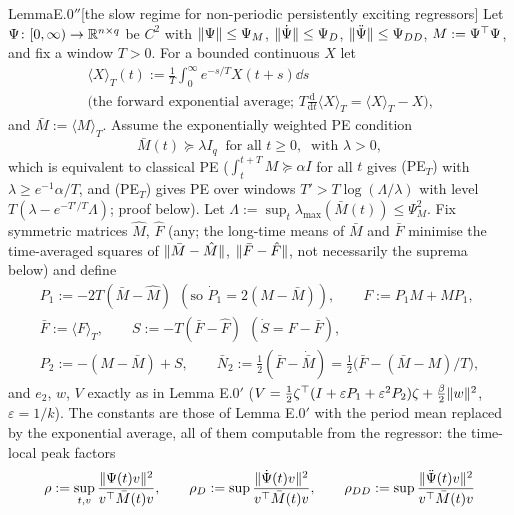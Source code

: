 \begin{thm}{Lemma}{E.0$''$}[the slow regime for non-periodic persistently exciting regressors]
Let $\Psi\colon[0,\infty)\to\mathbb{R}^{n\times q}$ be $C^2$ with $\lVert \Psi\rVert\le\Psi_M$, $\lVert \dot\Psi\rVert\le\Psi_D$,
$\lVert \ddot\Psi\rVert\le\Psi_{DD}$, $M:=\Psi^\top\Psi$, and fix a window $T>0$. For a bounded continuous $X$ let
\begin{gather*}
  \langle X\rangle_T(t):=\frac1T\int_0^\infty e^{-s/T}X(t+s)\dd s\\
  \text{(the forward exponential average; $T\tfrac{\mathrm{d}}{\mathrm{d}t}\langle X\rangle_T=\langle X\rangle_T-X$),}
\end{gather*}
and $\bar M:=\langle M\rangle_T$. Assume the exponentially weighted PE condition
\begin{equation}
  \bar M(t)\succeq\lambda I_q\ \text{ for all }t\ge0,\ \text{ with }\lambda>0,
  \tag{PE$_T$}
\end{equation}
which is equivalent to classical PE ($\int_t^{t+T}M\succeq\alpha I$ for all $t$ gives \textup{(PE$_T$)} with
$\lambda\ge e^{-1}\alpha/T$, and \textup{(PE$_T$)} gives PE over windows $T'>T\log(\Lambda/\lambda)$ with level
$T(\lambda-e^{-T'/T}\Lambda)$; proof below). Let $\Lambda:=\sup_t\lambda_{\max}(\bar M(t))\le\Psi_M^2$. Fix symmetric
matrices $\hat M$, $\hat F$ (any; the long-time means of $\bar M$ and $\bar F$ minimise the time-averaged squares of
$\lVert \bar M-\hat M\rVert$, $\lVert \bar F-\hat F\rVert$, not necessarily the suprema below) and define
\begin{gather*}
  P_1:=-2T(\bar M-\hat M)\ \ (\text{so }\dot P_1=2(M-\bar M)),\qquad F:=P_1M+MP_1,\\
  \bar F:=\langle F\rangle_T,\qquad S:=-T(\bar F-\hat F)\ \ (\dot S=F-\bar F),\\
  P_2:=-(M-\bar M)+S,\qquad \bar N_2:=\tfrac12(\bar F-\dot{\bar M})=\tfrac12\bigl(\bar F-(\bar M-M)/T\bigr),
\end{gather*}
and $e_2$, $w$, $V$ exactly as in Lemma E.0$'$
($V=\frac12\zeta^\top(I+\varepsilon P_1+\varepsilon^2P_2)\zeta+\frac\beta2\lVert w\rVert^2$, $\varepsilon=1/k$). The constants
are those of Lemma E.0$'$ with the period mean replaced by the exponential average, all of them computable from the
regressor: the time-local peak factors
\begin{gather*}
  \rho:=\sup_{t,v}\frac{\norm{\Psi(t)v}^2}{v^\T\bar M(t)v},\qquad
  \rho_D:=\sup\frac{\norm{\dot\Psi(t)v}^2}{v^\T\bar M(t)v},\qquad
  \rho_{DD}:=\sup\frac{\norm{\ddot\Psi(t)v}^2}{v^\T\bar M(t)v}\\

\end{gather*}
\end{thm}
